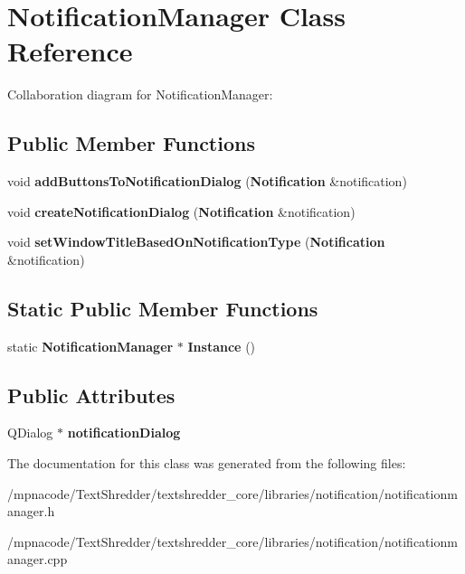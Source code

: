 \section{NotificationManager Class Reference}
\label{class_notification_manager}


Collaboration diagram for NotificationManager:
\subsection*{Public Member Functions}
\begin{DoxyCompactItemize}
\item 
void {\bfseries addButtonsToNotificationDialog} ({\bf Notification} \&notification)\label{class_notification_manager_a1479ae381037129062610bc71c0a5744}

\item 
void {\bfseries createNotificationDialog} ({\bf Notification} \&notification)\label{class_notification_manager_a1d30ee7ce01d51f33f219addca5395d9}

\item 
void {\bfseries setWindowTitleBasedOnNotificationType} ({\bf Notification} \&notification)\label{class_notification_manager_a2c0a6908cd5d75059e7ada13355933c2}

\end{DoxyCompactItemize}
\subsection*{Static Public Member Functions}
\begin{DoxyCompactItemize}
\item 
static {\bf NotificationManager} $\ast$ {\bfseries Instance} ()\label{class_notification_manager_a2a2c1ff23e34f4689eb85f85e9b9b637}

\end{DoxyCompactItemize}
\subsection*{Public Attributes}
\begin{DoxyCompactItemize}
\item 
QDialog $\ast$ {\bfseries notificationDialog}\label{class_notification_manager_ae08eff7b1393bf76588b6460d20971bd}

\end{DoxyCompactItemize}


The documentation for this class was generated from the following files:\begin{DoxyCompactItemize}
\item 
/mpnacode/TextShredder/textshredder\_\-core/libraries/notification/notificationmanager.h\item 
/mpnacode/TextShredder/textshredder\_\-core/libraries/notification/notificationmanager.cpp\end{DoxyCompactItemize}
